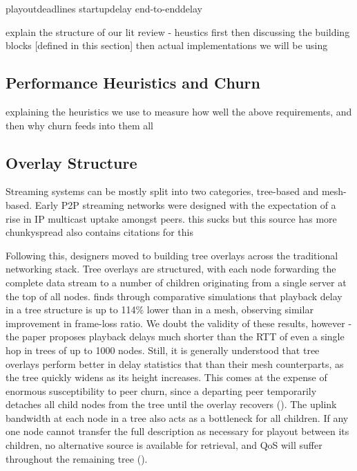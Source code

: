 \documentclass[12pt,a4paper]{article}
\begin{document}
playoutdeadlines startupdelay end-to-enddelay

explain the structure of our lit review - heustics first then discussing the building blocks [defined in this section] then actual implementations we will be using

\subsection{Performance Heuristics and Churn} \label{litreview:heuristics}
explaining the heuristics we use to measure how well the above requirements, and then why churn feeds into them all

\subsection{Overlay Structure} \label{litreview:structure}
Streaming systems can be mostly split into two categories, tree-based and mesh-based. Early P2P streaming networks were designed with the expectation of a rise in IP multicast uptake amongst peers. this sucks but this source \cite{Ghoshal2007} has more chunkyspread also contains citations for this

Following this, designers moved to building tree overlays across the traditional networking stack. Tree overlays are structured, with each node forwarding the complete data stream to a number of children originating from a single server at the top of all nodes. \cite{Goh2013} finds through comparative simulations that playback delay in a tree structure is up to 114\% lower than in a mesh, observing similar improvement in frame-loss ratio. We doubt the validity of these results, however - the paper proposes playback delays much shorter than the RTT of even a single hop in trees of up to 1000 nodes. Still, it is generally understood that tree overlays perform better in delay statistics that than their mesh counterparts, as the tree quickly widens as its height increases.  This comes at the expense of enormous susceptibility to peer churn, since a departing peer temporarily detaches all child nodes from the tree until the overlay recovers (\cite{Ghoshal2007}). The uplink bandwidth at each node in a tree also acts as a bottleneck for all children. If any one node cannot transfer the full description as necessary for playout between its children, no alternative source is available for retrieval, and QoS will suffer throughout the remaining tree (\cite{Magharei2007}).
\end{document}
